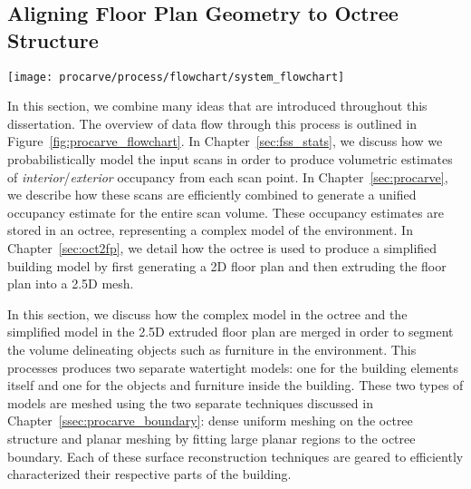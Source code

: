 \documentclass[12pt,onecolumn,oneside]{book}
\begin{document}
\subsection{Aligning Floor Plan Geometry to Octree Structure}
\label{ssec:procarve_fp_alignment}

\begin{figure*}[t]
	\centerline{\texttt{[image: procarve/process/flowchart/system\_flowchart]}}
	\caption[System flowchart of our approach.]{System flowchart of our approach.  Scan Preprocessing is described in Chapter~\ref{sec:fss_stats}, Carving is detailed in Chapter~\ref{sec:procarve}, Wall Sampling and Floor Plan Generation are discussed in Chapter~\ref{sec:oct2fp}, Merge Models is delineated in Chapter~\ref{ssec:procarve_fp_alignment}, and Planar and Detailed Meshing are documented in Chapter~\ref{ssec:procarve_boundary}.}
	\label{fig:procarve_flowchart}
\end{figure*}

In this section, we combine many ideas that are introduced throughout this dissertation.  The overview of data flow through this process is outlined in Figure~\ref{fig:procarve_flowchart}.  In Chapter~\ref{sec:fss_stats}, we discuss how we probabilistically model the input scans in order to produce volumetric estimates of {\it interior}/{\it exterior} occupancy from each scan point.  In Chapter~\ref{sec:procarve}, we describe how these scans are efficiently combined to generate a unified occupancy estimate for the entire scan volume.  These occupancy estimates are stored in an octree, representing a complex model of the environment.  In Chapter~\ref{sec:oct2fp}, we detail how the octree is used to produce a simplified building model by first generating a 2D floor plan and then extruding the floor plan into a 2.5D mesh.  

In this section, we discuss how the complex model in the octree and the simplified model in the 2.5D extruded floor plan are merged in order to segment the volume delineating objects such as furniture in the environment.  This processes produces two separate watertight models:  one for the building elements itself and one for the objects and furniture inside the building.  These two types of models are meshed using the two separate techniques discussed in Chapter~\ref{ssec:procarve_boundary}:  dense uniform meshing on the octree structure and planar meshing by fitting large planar regions to the octree boundary.  Each of these surface reconstruction techniques are geared to efficiently characterized their respective parts of the building.
\end{document}
